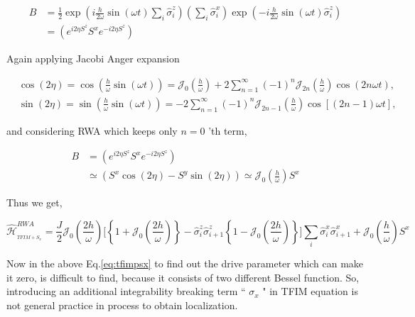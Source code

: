 \documentclass[a4paper,11pt]{article}
\begin{document}
\begin{align*}
B & =\frac{1}{2} \exp \left(i \frac{h}{2 \omega} \sin (\omega t) \sum_{i} \hat{\sigma}_{i}^{z}\right)\left(\sum_{i} \hat{\sigma}_{i}^{x}\right) \exp \left(-i \frac{h}{2 \omega} \sin (\omega t) \hat{\sigma}_{i}^{z}\right) \\
& =\left(e^{i 2 \eta S^{z}} S^{x} e^{-i 2 \eta S^{z}}\right)
\end{align*}

Again applying Jacobi Anger expansion

\begin{align*}
& \cos (2 \eta)=\cos \left(\frac{h}{\omega} \sin (\omega t)\right)=\mathcal{J}_{0}\left(\frac{h}{\omega}\right)+2 \sum_{n=1}^{\infty}(-1)^{n} \mathcal{J}_{2 n}\left(\frac{h}{\omega}\right) \cos (2 n \omega t), \\
& \sin (2 \eta)=\sin \left(\frac{h}{\omega} \sin (\omega t)\right)=-2 \sum_{n=1}^{\infty}(-1)^{n} \mathcal{J}_{2 n-1}\left(\frac{h}{\omega}\right) \cos [(2 n-1) \omega t],
\end{align*}

and considering RWA which keeps only $n=0$ 'th term,

\begin{align}
B & =\left(e^{i 2 \eta S^{z}} S^{x} e^{-i 2 \eta S^{z}}\right) \nonumber\\
& \simeq\left(S^{x} \cos (2 \eta)-S^{y} \sin (2 \eta)\right) \simeq \mathcal{J}_{0}\left(\frac{h}{\omega}\right) S^{x}
\label{eq:B}
\end{align}

Thus we get,

\begin{equation}
\hat{\mathcal{H}}_{_{TFIM+S_{x}}}^{R W A}=\frac{J}{2} \mathcal{J}_0\left(\frac{2h}{\omega}\right)\Bigg[\left\{1+ \mathcal{J}_0\left(\frac{2h}{\omega}\right)\right\} - \hat{\sigma}^z_i\hat{\sigma}^z_{i+1}\left\{1- \mathcal{J}_0\left(\frac{2h}{\omega}\right)\right\} \Bigg]\sum_{i} \hat{\sigma}_{i}^{x} \hat{\sigma}_{i+1}^{x} +\mathcal{J}_{0}\left(\frac{h}{\omega}\right) S^{x}
\label{eq:tfimpsx}
\end{equation}

Now in the above Eq.\eqref{eq:tfimpsx} to find out the drive parameter which can make it zero, is difficult to find, because it consists of two different Bessel function. So, introducing an additional integrability breaking term `` $\sigma_{x}$ " in TFIM equation is not general practice in process to obtain localization.
\end{document}
